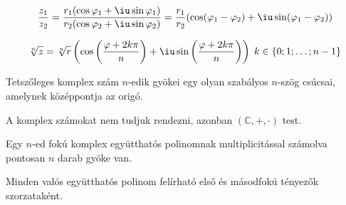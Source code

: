 \begin{blueBox}
  \[
    \frac{z_1}{z_2}
    = \frac{
      r_1 (\cos \varphi_1 + \iu \sin \varphi_1)
    }{
      r_2 (\cos \varphi_2 + \iu \sin \varphi_2)
    }
    = \frac{r_1}{r_2} (\cos (\varphi_1 - \varphi_2) + \iu \sin (\varphi_1 - \varphi_2))
  \]
\end{blueBox}

\begin{blueBox}
  \[
    \sqrt[n]{z}
    = \sqrt[n]{r} \left(
    \cos \left( \frac{\varphi + 2k\pi}{n} \right) + \iu \sin \left( \frac{\varphi + 2k\pi}{n} \right)
    \right)
    \;
    k \in \{0; 1; \ldots; n-1\}
  \]
\end{blueBox}

\begin{note}
  Tetszőleges komplex szám $n$-edik gyökei egy olyan szabályos $n$-szög csúcsai,
  amelynek középpontja az origó.
  \begin{center}
  \end{center}
\end{note}

\begin{note}
  A komplex számokat nem tudjuk rendezni, azonban $(\mathbb C, +, \cdot)$
  test.
\end{note}

\begin{theorem}
  Egy $n$-ed fokú komplex együtthatós polinomnak multiplicitással számolva
  pontosan $n$ darab gyöke van.
\end{theorem}

\begin{note}
  Minden valós együtthatós polinom felírható első és másodfokú tényezők
  szorzataként.
\end{note}